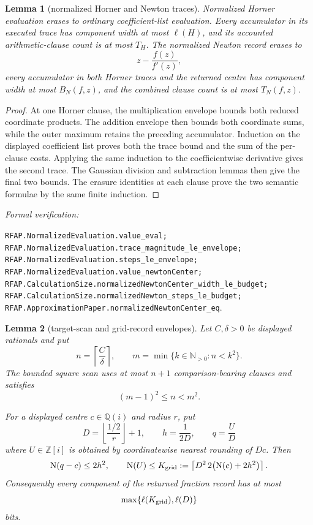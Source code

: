 \documentclass[11pt]{article}
\newtheorem{lemma}[lemma]{Lemma}
\newcommand{\Qi}{\mathbb{Q}(i)}
\newcommand{\Zi}{\mathbb{Z}[i]}
\newcommand{\N}{\mathbb{N}}
\newcommand{\Norm}[1]{\operatorname{N}\!\left(#1\right)}
\newcommand{\leanref}[1]{\par\smallskip\noindent
  \emph{Formal verification:}\par\nobreak
  {\raggedright\nolinkurl{#1}.\par}}
\begin{document}
\begin{lemma}[normalized Horner and Newton traces]
\label{lem:normalized-horner-envelope}
Normalized Horner evaluation erases to ordinary coefficient-list evaluation.
Every accumulator in its executed trace has component width at most
$\ell(H)$, and its accounted arithmetic-clause count is at most $T_H$.
The normalized Newton record erases to
\[
                z-\frac{f(z)}{f'(z)},
\]
every accumulator in both Horner traces and the returned centre has component
width at most $B_N(f,z)$, and the combined clause count is at most
$T_N(f,z)$.
\end{lemma}

\begin{proof}
At one Horner clause, the multiplication envelope bounds both reduced
coordinate products.  The addition envelope then bounds both coordinate
sums, while the outer maximum retains the preceding accumulator.  Induction
on the displayed coefficient list proves both the trace bound and the sum of
the per-clause costs.  Applying the same induction to the coefficientwise
derivative gives the second trace.  The Gaussian division and subtraction
lemmas then give the final two bounds.  The erasure identities at each clause
prove the two semantic formulae by the same finite induction.
\end{proof}

\leanref{RFAP.NormalizedEvaluation.value_eval;
RFAP.NormalizedEvaluation.trace_magnitude_le_envelope;
RFAP.NormalizedEvaluation.steps_le_envelope;
RFAP.NormalizedEvaluation.value_newtonCenter;
RFAP.CalculationSize.normalizedNewtonCenter_width_le_budget;
RFAP.CalculationSize.normalizedNewton_steps_le_budget;
RFAP.ApproximationPaper.normalizedNewtonCenter_eq}

\begin{lemma}[target-scan and grid-record envelopes]
\label{lem:target-grid-envelope}
Let $C,\delta>0$ be displayed rationals and put
\[
 n=\left\lceil\frac C\delta\right\rceil,
 \qquad m=\min\{k\in\N_{>0}:n<k^2\}.
\]
The bounded square scan uses at most $n+1$ comparison-bearing clauses and
satisfies
\[
                         (m-1)^2\le n<m^2.
\]

For a displayed centre $c\in\Qi$ and radius $r$, put
\[
 D=\left\lfloor\frac{1/2}{r}\right\rfloor+1,
 \qquad h=\frac1{2D},
 \qquad q=\frac UD
\]
where $U\in\Zi$ is obtained by coordinatewise nearest rounding of $Dc$.
Then
\[
 \Norm{q-c}\le2h^2,
 \qquad
 \Norm U\le
 K_{\rm grid}:=\left\lceil
       D^2\,2\bigl(\Norm c+2h^2\bigr)\right\rceil.
\]
Consequently every component of the returned fraction record has at most
\[
                   \max\{\ell(K_{\rm grid}),\ell(D)\}
\]
bits.
\end{lemma}
\end{document}
